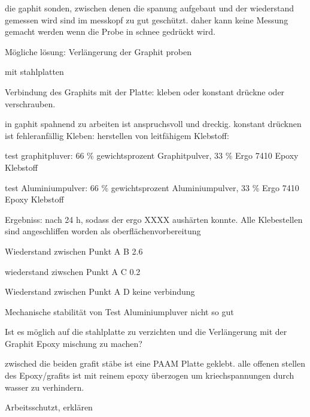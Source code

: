 die gaphit sonden, zwischen denen die spanung aufgebaut und der wiederstand gemessen wird sind im messkopf zu gut geschützt. daher kann keine Messung gemacht werden wenn die Probe in schnee gedrückt wird.

Mögliche lösung: Verlängerung der Graphit proben

mit stahlplatten

Verbindung des Graphits mit der Platte: kleben oder konstant drückne oder verschrauben.

in gaphit spahnend zu arbeiten ist anspruchsvoll und dreckig.
konstant drücknen ist fehleranfällig
Kleben: herstellen von leitfähigem Klebstoff:

test graphitpluver: 66 \% gewichtsprozent Graphitpulver, 33 \% Ergo 7410 Epoxy Klebstoff

test Aluminiumpulver: 66 \% gewichtsprozent Aluminiumpulver, 33 \% Ergo 7410 Epoxy Klebstoff


Ergebniss: nach 24 h, sodass der ergo XXXX aushärten konnte.
Alle Klebestellen sind angeschliffen worden als oberflächenvorbereitung

Wiederstand zwischen Punkt A B 2.6 \ohm

wiederstand ziwschen Punkt A C 0.2 \ohm

Wiederstand zwischen Punkt A D keine verbindung

Mechanische stabilität von Test Aluminiumpluver nicht so gut

Ist es möglich auf die stahlplatte zu verzichten und die Verlängerung mit der Graphit Epoxy mischung zu machen?

zwisched die beiden grafit stäbe ist eine PAAM Platte geklebt. alle offenen stellen des Epoxy/grafits ist mit reinem epoxy überzogen um kriechspannungen durch wasser zu verhindern.

Arbeitsschutzt, erklären
